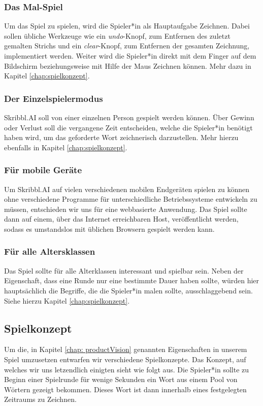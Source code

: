 \documentclass[11pt]{article}
\begin{document}
\subsubsection{Das Mal-Spiel}
Um das Spiel zu spielen, wird die Spieler*in als Hauptaufgabe Zeichnen. Dabei sollen übliche Werkzeuge wie ein \textit{undo}-Knopf, zum Entfernen des zuletzt gemalten Strichs und ein \textit{clear}-Knopf, zum Entfernen der gesamten Zeichnung, implementiert werden. Weiter wird die Spieler*in direkt mit dem Finger auf dem Bildschirm beziehungsweise mit Hilfe der Maus Zeichnen können. Mehr dazu in Kapitel \ref{chap:spielkonzept}.
\subsubsection{Der Einzelspielermodus}
Skribbl.AI soll von einer einzelnen Person gespielt werden können. Über Gewinn oder Verlust soll die vergangene Zeit entscheiden, welche die Spieler*in benötigt haben wird, um das geforderte Wort zeichnerisch darzustellen. Mehr hierzu ebenfalls in Kapitel \ref{chap:spielkonzept}.
\subsubsection{Für mobile Geräte}
Um Skribbl.AI auf vielen verschiedenen mobilen Endgeräten spielen zu können ohne verschiedene Programme für unterschiedliche Betriebssysteme entwickeln zu müssen, entschieden wir uns für eine webbasierte Anwendung. Das Spiel sollte dann auf einem, über das Internet erreichbaren Host, veröffentlicht werden, sodass es umstandslos mit üblichen Browsern gespielt werden kann.
\subsubsection{Für alle Altersklassen}
Das Spiel sollte für alle Alterklassen interessant und spielbar sein. Neben der Eigenschaft, dass eine Runde nur eine bestimmte Dauer haben sollte, würden hier hauptsächlich die Begriffe, die die Spieler*in malen sollte, ausschlaggebend sein. Siehe hierzu Kapitel \ref{chap:spielkonzept}.
\subsection{Spielkonzept}
Um die, in Kapitel \ref{chap: productVision} genannten Eigenschaften in unserem Spiel umzusetzen entwarfen wir verschiedene Spielkonzepte. Das Konzept, auf welches wir uns letzendlich einigten sieht wie folgt aus.
Die Spieler*in sollte zu Beginn einer Spielrunde für wenige Sekunden ein Wort aus einem Pool von Wörtern gezeigt bekommen. Dieses Wort ist dann innerhalb eines festgelegten Zeitraums zu Zeichnen.
\end{document}
